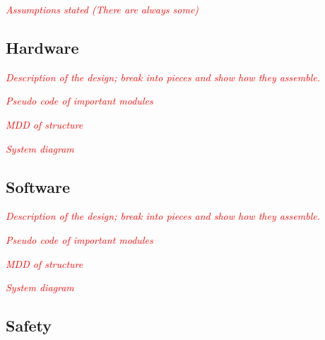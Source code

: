 \textit{\textcolor{red}{Assumptions stated (There are always some)}}


\subsection{Hardware}

\textit{\textcolor{red}{Description of the design; break into pieces and show how 
						they assemble.}}

\textit{\textcolor{red}{Pseudo code of important modules}}

\textit{\textcolor{red}{MDD of structure}}

\textit{\textcolor{red}{System diagram}}


\subsection{Software}
\textit{\textcolor{red}{Description of the design; break into pieces and show how 
						they assemble.}}

\textit{\textcolor{red}{Pseudo code of important modules}}

\textit{\textcolor{red}{MDD of structure}}

\textit{\textcolor{red}{System diagram}}

\subsection{Safety}
